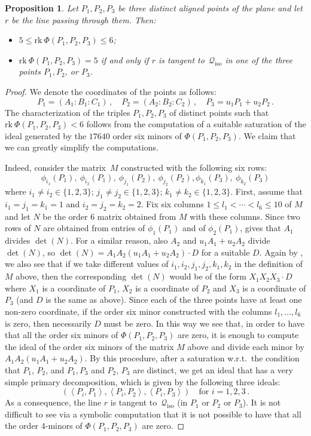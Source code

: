 \documentclass{amsart}
\theoremstyle{plain}
\newtheorem{prop}[lemma]{Proposition}
\theoremstyle{definition}
\newcommand{\iso}{\mathcal{Q}_{\mathrm{iso}}}
\newcommand{\scl}[2]{\left\langle {#1}, {#2} \right\rangle}
\newcommand{\rk}{\ensuremath{\mathrm{rk}}}
\begin{document}
\begin{prop}
\label{proposition:three_aligned_ranks}
Let $P_1, P_2, P_3$ be three distinct aligned points of the plane and let
$r$ be the line passing through them. Then:
\begin{itemize}
\item $5 \leq \rk \ \Phi(P_1, P_2, P_3) \leq 6$;
\item
$\rk \ \Phi(P_1, P_2, P_3) = 5$ if and only if $r$ is tangent
to~$\iso$ in one of the three points $P_1, P_2$, or $P_3$.
\end{itemize}
\end{prop}
\begin{proof} We denote the coordinates of the points as follows:
%
\[
P_1 = (A_1: B_1: C_1) \,, \quad P_2 = (A_2: B_2: C_2) \,, \quad P_3 = u_1P_1+u_2P_2 \,.
\]
%
The characterization of the triples $P_1, P_2, P_3$ of distinct points such that $\rk \ \Phi(P_1, P_2, P_3) < 6$ follows from the computation of a suitable saturation of the ideal generated by the $17640$ order six minors of $\Phi(P_1, P_2, P_3)$.
We claim that we can greatly simplify the computations.

Indeed, consider the matrix~$M$ constructed with the following six rows:
\[
\phi_{i_1}(P_1), \ \phi_{i_2}(P_1), \ \phi_{j_1}(P_2),\  \phi_{j_2}(P_2),
\phi_{k_1}(P_3), \ \phi_{k_2}(P_3)
\]
where $i_1 \not= i_2 \in \{1, 2, 3\}$; $j_1 \not= j_2 \in \{1, 2, 3\}$;
$k_1 \not= k_2 \in \{1, 2, 3\}$.
First, assume that $i_1=j_1=k_1=1$ and
$i_2=j_2=k_2=2$. Fix six columns
$1\leq l_1 < \cdots < l_6 \leq 10$ of $M$ and let $N$ be the order $6$ matrix
obtained from $M$ with these columns. Since two rows of $N$ are obtained from
entries of $\phi_1(P_1)$ and of $\phi_2(P_1)$,
 gives that $A_1$ divides $\det(N)$. For a similar
reason, also $A_2$ and $u_1A_1+u_2A_2$ divide $\det(N)$, so
$\det(N) = A_1A_2(u_1A_1+u_2A_2)\cdot D$ for a suitable $D$.
Again by , we also see that if we take different values of
$i_1, i_2, j_1, j_2, k_1, k_2$ in the definition of $M$ above, then
the corresponding $\det(N)$ would be of the form $X_1X_2X_3\cdot D$ where
$X_1$ is a coordinate of $P_1$, $X_2$ is a coordinate of $P_2$ and $X_3$ is
a coordinate of $P_3$ (and $D$ is the same as above). Since each of the three
points have at least one non-zero coordinate, if the order six minor
constructed with the columns $l_1, \dots, l_6$ is zero, then necessarily $D$
must be zero. In this way we see that, in order to have that all the order
six minors of $\Phi(P_1, P_2, P_3)$ are zero, it is enough to compute the
ideal of the order six minors of the matrix $M$ above and divide each
minor by $A_1A_2(u_1A_1+u_2A_2)$. By this procedure, after
a saturation w.r.t.\ the condition that $P_1$, $P_2$, and $P_1, P_3$ and
$P_2$, $P_3$ are distinct, we get an ideal that has
a very simple primary decomposition, which is given by the following three
ideals:
%
\[
\left(\scl{P_i}{P_1}, \scl{P_i}{P_2},\scl{P_i}{P_3}\right) \quad
\mbox{for } i = 1, 2, 3 \,.
\]
%
As a consequence, the line $r$ is tangent to~$\iso$
(in $P_1$ or $P_2$ or $P_3$).
It is not difficult to see via a symbolic computation that it is not possible to have that all the order
$4$-minors of $\Phi(P_1, P_2, P_3)$ are zero.
\end{proof}
\end{document}

